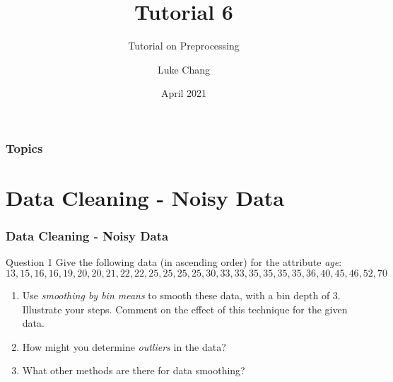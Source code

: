 \documentclass[aspectratio=169, 10pt]{beamer}
\title{Tutorial 6}
\subtitle{Tutorial on Preprocessing}
\author{Luke Chang}
\institute{The University of Auckland}
\date{April 2021}
\begin{document}
\frame{\titlepage}

\begin{frame}
    \frametitle{Topics}

    \tableofcontents
        
\end{frame}

\section{Data Cleaning - Noisy Data}
\begin{frame}[t]
    \frametitle{Data Cleaning - Noisy Data}

    \begin{block}{Question 1}
        Give the following data (in ascending order) for the attribute \textit{age}: 
        \[13,15,16,16,19,20,20,21,22,22,25,25,25,25,30,33,33,35,35,35,35,36,40,45,46,52,70\]
    \end{block}

    \begin{enumerate}
        \item Use \textit{smoothing by bin means} to smooth these data, with a bin depth of 3. 
        Illustrate your steps. Comment on the effect of this technique for the given data.
        \item How might you determine \textit{outliers} in the data?
        \item What other methods are there for data smoothing?
    \end{enumerate}

\end{frame}
\end{document}
